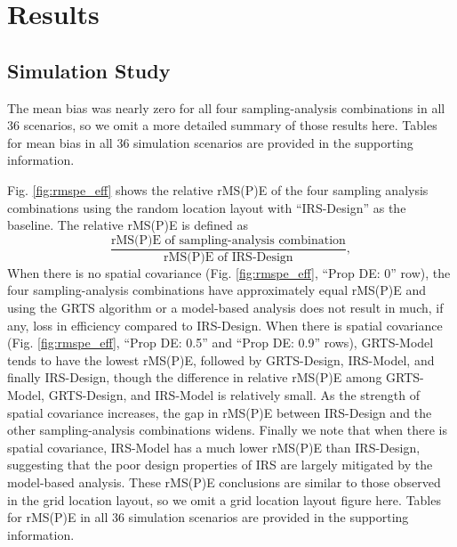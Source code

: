 \documentclass[]{elsarticle} %
\begin{document}
\hypertarget{sec:results}{%
\section{Results}\label{sec:results}}

\hypertarget{sec:r_sim}{%
\subsection{Simulation Study}\label{sec:r_sim}}

The mean bias was nearly zero for all four sampling-analysis
combinations in all 36 scenarios, so we omit a more detailed summary of
those results here. Tables for mean bias in all 36 simulation scenarios
are provided in the supporting information.

Fig. \ref{fig:rmspe_eff} shows the relative rMS(P)E of the four sampling
analysis combinations using the random location layout with
``IRS-Design'' as the baseline. The relative rMS(P)E is defined as
\begin{equation*}
\frac{\text{rMS(P)E of sampling-analysis combination}}{\text{rMS(P)E of IRS-Design}},
\end{equation*} When there is no spatial covariance (Fig.
\ref{fig:rmspe_eff}, ``Prop DE: 0'' row), the four sampling-analysis
combinations have approximately equal rMS(P)E and using the GRTS
algorithm or a model-based analysis does not result in much, if any,
loss in efficiency compared to IRS-Design. When there is spatial
covariance (Fig. \ref{fig:rmspe_eff}, ``Prop DE: 0.5'' and ``Prop DE:
0.9'' rows), GRTS-Model tends to have the lowest rMS(P)E, followed by
GRTS-Design, IRS-Model, and finally IRS-Design, though the difference in
relative rMS(P)E among GRTS-Model, GRTS-Design, and IRS-Model is
relatively small. As the strength of spatial covariance increases, the
gap in rMS(P)E between IRS-Design and the other sampling-analysis
combinations widens. Finally we note that when there is spatial
covariance, IRS-Model has a much lower rMS(P)E than IRS-Design,
suggesting that the poor design properties of IRS are largely mitigated
by the model-based analysis. These rMS(P)E conclusions are similar to
those observed in the grid location layout, so we omit a grid location
layout figure here. Tables for rMS(P)E in all 36 simulation scenarios
are provided in the supporting information.
\end{document}
